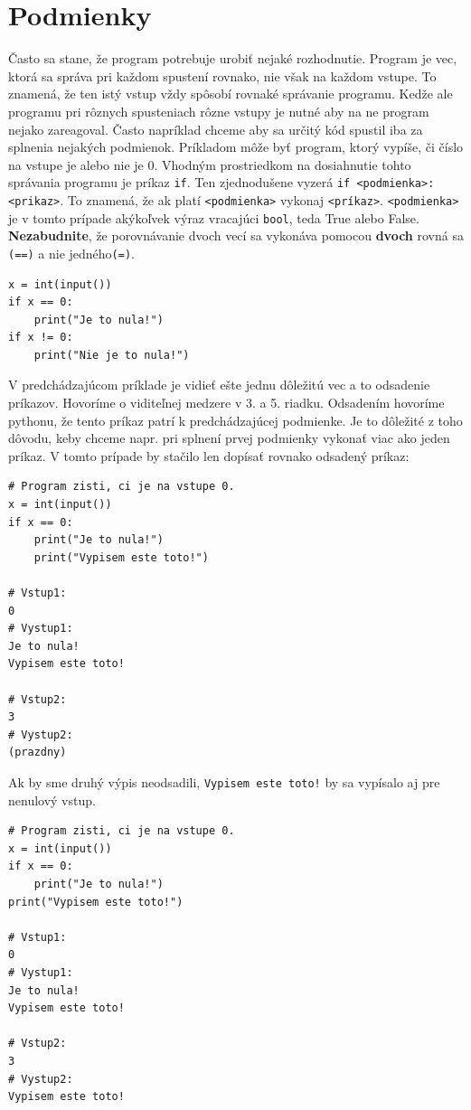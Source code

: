 \documentclass{article}
\begin{document}
\section{Podmienky}

Často sa stane, že program potrebuje urobiť nejaké rozhodnutie. Program je vec, ktorá sa správa pri každom spustení rovnako, nie však na každom vstupe. To znamená, že ten istý vstup vždy spôsobí rovnaké správanie programu. Kedže ale programu pri rôznych spusteniach rôzne vstupy je nutné aby na ne program nejako zareagoval. Často napríklad chceme aby sa určitý kód spustil iba za splnenia nejakých podmienok. Príkladom môže byť program, ktorý vypíše, či číslo na vstupe je alebo nie je 0. Vhodným prostriedkom na dosiahnutie tohto správania programu je príkaz \texttt{if}. Ten
zjednodušene vyzerá \texttt{if <podmienka>: <prikaz>}. To znamená, že ak platí \texttt{<podmienka>}
vykonaj \texttt{<príkaz>}. \texttt{<podmienka>} je v tomto prípade akýkoľvek výraz vracajúci \texttt{bool}, teda True alebo False. \textbf{Nezabudnite}, že porovnávanie dvoch vecí sa vykonáva pomocou
\textbf{dvoch} rovná sa \texttt{(==)} a nie jedného\texttt{(=)}.

\begin{lstlisting}
x = int(input())
if x == 0:
    print("Je to nula!")
if x != 0:
    print("Nie je to nula!")
\end{lstlisting}

V predchádzajúcom príklade je vidieť ešte jednu dôležitú vec a to odsadenie príkazov. Hovoríme o viditeľnej medzere v 3. a 5. riadku. Odsadením hovoríme pythonu, že tento príkaz patrí k predchádzajúcej podmienke. Je to dôležité z toho dôvodu, keby chceme napr. pri splnení prvej podmienky vykonať viac ako jeden príkaz. V tomto prípade by stačilo len dopísať rovnako odsadený príkaz:

\begin{lstlisting}
# Program zisti, ci je na vstupe 0.
x = int(input())
if x == 0:
    print("Je to nula!")
    print("Vypisem este toto!")
    
# Vstup1:
0
# Vystup1:
Je to nula!
Vypisem este toto!

# Vstup2:
3
# Vystup2:
(prazdny)
\end{lstlisting}

Ak by sme druhý výpis neodsadili, \texttt{Vypisem este toto!} by sa vypísalo aj pre nenulový vstup.
\begin{lstlisting}
# Program zisti, ci je na vstupe 0.
x = int(input())
if x == 0:
    print("Je to nula!")
print("Vypisem este toto!")
    
# Vstup1:
0
# Vystup1:
Je to nula!
Vypisem este toto!

# Vstup2:
3
# Vystup2:
Vypisem este toto!
\end{lstlisting}
\end{document}
